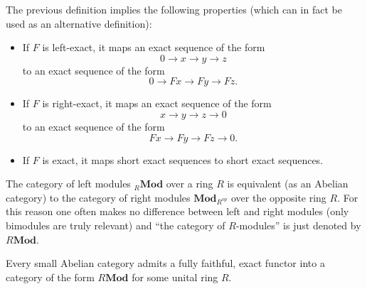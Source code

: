     \begin{result}
        The previous definition implies the following properties (which can in fact be used as an alternative definition):
        \begin{itemize}
            \item If $F$ is left-exact, it maps an exact sequence of the form \[0\longrightarrow x\longrightarrow y\longrightarrow z\]
            to an exact sequence of the form \[0\longrightarrow Fx\longrightarrow Fy\longrightarrow Fz.\]
            \item If $F$ is right-exact, it maps an exact sequence of the form \[x\longrightarrow y\longrightarrow z\longrightarrow 0\]
            to an exact sequence of the form \[Fx\longrightarrow Fy\longrightarrow Fz\longrightarrow 0.\]
            \item If $F$ is exact, it maps short exact sequences to short exact sequences.
        \end{itemize}
    \end{result}

    \begin{notation}
        The category of left modules ${}_R\mathbf{Mod}$ over a ring $R$ is equivalent (as an Abelian category) to the category of right modules $\mathbf{Mod}_{R^{op}}$ over the opposite ring $R$. For this reason one often makes no difference between left and right modules (only bimodules are truly relevant) and ``the category of $R$-modules'' is just denoted by $R\mathbf{Mod}$.
    \end{notation}

    \begin{theorem}\label{cat:freyd_mitchell}
        Every small Abelian category admits a fully faithful, exact functor into a category of the form $R\mathbf{Mod}$ for some unital ring $R$.
    \end{theorem}

